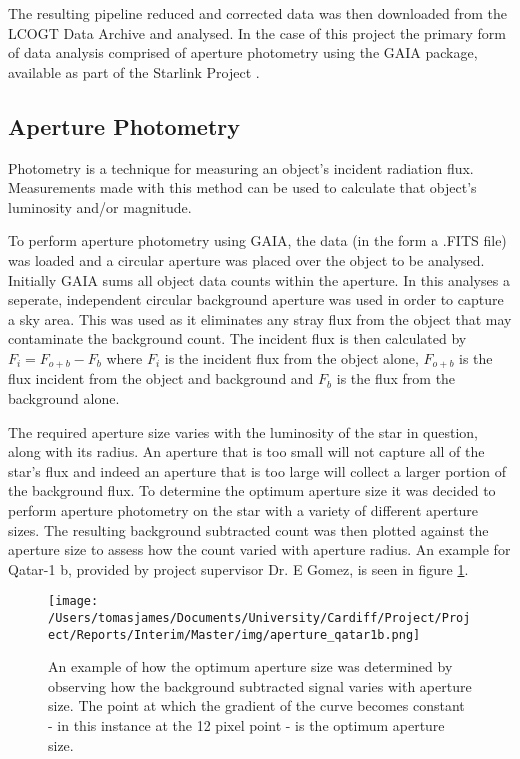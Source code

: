 \documentclass[twoside]{article}
\begin{document}
\begin{multicols}{2}
The resulting pipeline reduced and corrected data was then downloaded from the LCOGT Data Archive and analysed. In the case of this project the primary form of data analysis comprised of aperture photometry using the GAIA package, available as part of the Starlink Project \citep{starlink}.

\subsection{Aperture Photometry}
Photometry is a technique for measuring an object's incident radiation flux. Measurements made with this method can be used to calculate that object's luminosity and/or magnitude.

To perform aperture photometry using GAIA, the data (in the form a .FITS file) was loaded and a circular aperture was placed over the object to be analysed. Initially GAIA sums all object data counts within the aperture. In this analyses a seperate, independent circular background aperture was used in order to capture a sky area. This was used as it eliminates any stray flux from the object that may contaminate the background count. The incident flux is then calculated by $F_{i} = F_{o+b} - F_{b}$ where $F_{i}$ is the incident flux from the object alone, $F_{o+b}$ is the flux incident from the object and background and $F_{b}$ is the flux from the background alone.

The required aperture size varies with the luminosity of the star in question, along with its radius. An aperture that is too small will not capture all of the star's flux and indeed an aperture that is too large will collect a larger portion of the background flux. To determine the optimum aperture size it was decided to perform aperture photometry on the star with a variety of different aperture sizes.  The resulting background subtracted count was then plotted against the aperture size to assess how the count varied with aperture radius. An example for Qatar-1 b, provided by project supervisor Dr. E Gomez, is seen in figure \ref{qatar1b}.

\begin{figure}[H]
\centering
    \texttt{[image: /Users/tomasjames/Documents/University/Cardiff/Project/Project/Reports/Interim/Master/img/aperture\_qatar1b.png]}
\caption[An example of how the optimum aperture size was determined by observing how the background subtracted signal varies with aperture size. The point at which the gradient of the curve becomes constant - in this instance at the 12 pixel point - is the optimum aperture size.]{An example of how the optimum aperture size was determined by observing how the background subtracted signal varies with aperture size. The point at which the gradient of the curve becomes constant - in this instance at the 12 pixel point - is the optimum aperture size.} \label{qatar1b}
\end{figure}


\end{multicols}
\end{document}
